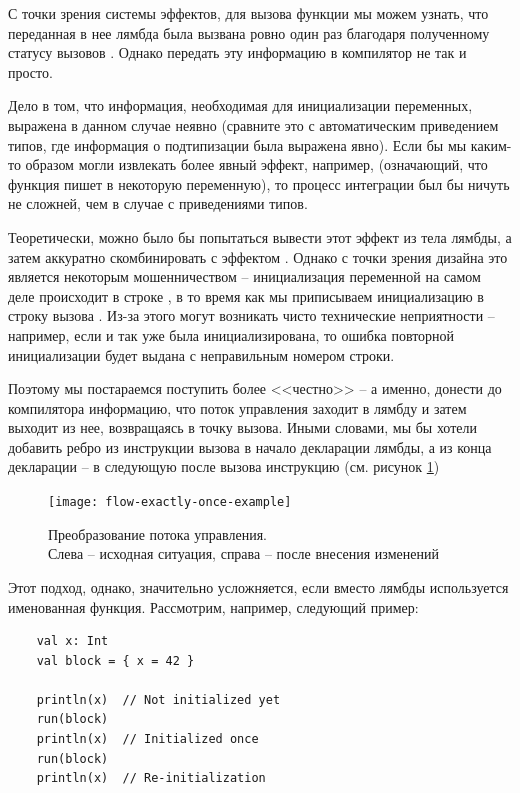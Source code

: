 С точки зрения системы эффектов, для вызова функции  мы можем узнать, что переданная в нее лямбда была вызвана ровно один раз благодаря полученному статусу вызовов . Однако передать эту информацию в компилятор не так и просто.

Дело в том, что информация, необходимая для инициализации переменных, выражена в данном случае неявно (сравните это с автоматическим приведением типов, где информация о подтипизации была выражена явно). Если бы мы каким-то образом могли извлекать более явный эффект, например,  (означающий, что функция пишет в некоторую переменную), то процесс интеграции был бы ничуть не сложней, чем в случае с приведениями типов.

Теоретически, можно было бы попытаться вывести этот эффект из тела лямбды, а затем аккуратно скомбинировать с эффектом . Однако с точки зрения дизайна это является некоторым мошенничеством -- инициализация переменной на самом деле происходит в строке , в то время как мы приписываем инициализацию в строку вызова . Из-за этого могут возникать чисто технические неприятности -- например, если  и так уже была инициализирована, то ошибка повторной инициализации будет выдана с неправильным номером строки.

Поэтому мы постараемся поступить более <<честно>> -- а именно, донести до компилятора информацию, что поток управления заходит в лямбду и затем выходит из нее, возвращаясь в точку вызова. Иными словами, мы бы хотели добавить ребро из инструкции вызова в начало декларации лямбды, а из конца декларации -- в следующую после вызова инструкцию (см. рисунок \ref{fig:flow-exactly-once-example})

\begin{figure}[h]
	\texttt{[image: flow-exactly-once-example]}
	
	\caption{Преобразование потока управления. \\ Слева -- исходная ситуация, справа -- после внесения изменений}
	\label{fig:flow-exactly-once-example}
\end{figure}

Этот подход, однако, значительно усложняется, если вместо лямбды используется именованная функция. Рассмотрим, например, следующий пример:

\begin{verbatim}
	val x: Int
	val block = { x = 42 }
	
	println(x)	// Not initialized yet
	run(block)	
	println(x)	// Initialized once
	run(block)
	println(x)	// Re-initialization
\end{verbatim}

